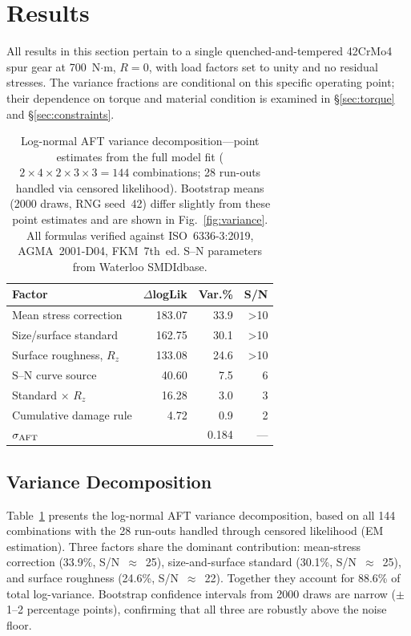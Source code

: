 \documentclass[12pt,a4paper]{article}
\begin{document}
\section{Results}
\label{sec:results}

All results in this section pertain to a single quenched-and-tempered
42CrMo4 spur gear at 700~N$\cdot$m, $R=0$, with load factors set to
unity and no residual stresses. The variance fractions are conditional
on this specific operating point; their dependence on torque and
material condition is examined in \S\ref{sec:torque} and
\S\ref{sec:constraints}.

\begin{table}[h]
\centering
\caption{Log-normal AFT variance decomposition---point estimates from the
full model fit ($2\times4\times2\times3\times3 = 144$ combinations;
28 run-outs handled via censored likelihood). Bootstrap means
(2000 draws, RNG seed~42) differ slightly from these point estimates
and are shown in Fig.~\ref{fig:variance}.%
All formulas verified against ISO~6336-3:2019, AGMA~2001-D04, FKM~7th~ed.
S--N parameters from Waterloo SMDIdbase.}
\label{tab:anova}
\begin{tabular}{lrrr}
\toprule
Factor & $\Delta$logLik & Var.\% & S/N \\
\midrule
Mean stress correction      & 183.07 & 33.9 & >10 \\
Size/surface standard       & 162.75 & 30.1 & >10 \\
Surface roughness, $R_z$    & 133.08 & 24.6 & >10 \\
S--N curve source           &  40.60 &  7.5 &  ~6 \\
Standard $\times$ $R_z$     &  16.28 &  3.0 &  ~3 \\
Cumulative damage rule      &   4.72 &  0.9 &  ~2 \\
\midrule
$\sigma_{\rm AFT}$          &        & 0.184 & --- \\
\bottomrule
\end{tabular}
\end{table}

\subsection{Variance Decomposition}

Table~\ref{tab:anova} presents the log-normal AFT variance
decomposition, based on all 144 combinations with the 28 run-outs
handled through censored likelihood (EM estimation). Three factors share the
dominant contribution: mean-stress correction (33.9\%, S/N~$\approx$~25),
size-and-surface standard (30.1\%, S/N~$\approx$~25), and surface roughness
(24.6\%, S/N~$\approx$~22). Together they account for 88.6\% of total
log-variance. Bootstrap confidence intervals from 2000 draws are narrow
($\pm$1--2 percentage points), confirming that all three are robustly
above the noise floor.
\end{document}
